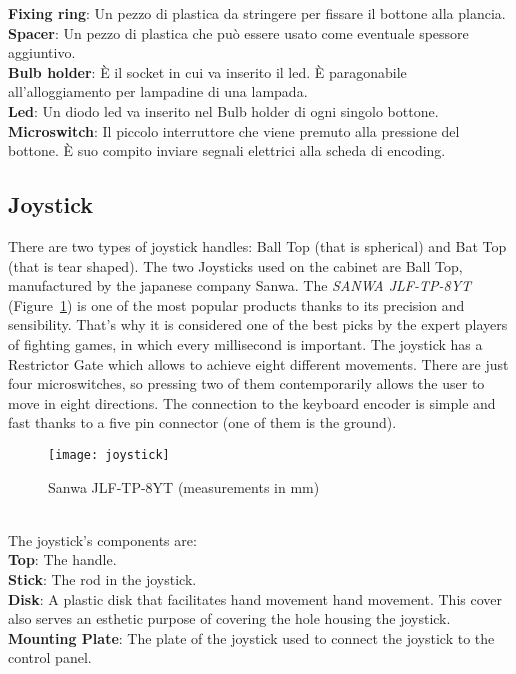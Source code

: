 \textbf{Fixing ring}: Un pezzo di plastica da stringere per fissare il bottone alla plancia.\\
\textbf{Spacer}: Un pezzo di plastica che può essere usato come eventuale spessore aggiuntivo.\\
\textbf{Bulb holder}: È il socket in cui va inserito il led. È paragonabile all’alloggiamento per lampadine di una lampada.\\
\textbf{Led}: Un diodo led va inserito nel Bulb holder di ogni singolo bottone.\\
\textbf{Microswitch}: Il piccolo interruttore che viene premuto alla pressione del bottone. È suo compito inviare segnali elettrici alla scheda di encoding.\\
\subsection{Joystick}
There are two types of joystick handles: Ball Top (that is spherical) and Bat Top (that is tear shaped). The two Joysticks used on the cabinet are Ball Top, manufactured by the japanese company Sanwa. The \textit{SANWA JLF-TP-8YT} (Figure~\ref{fig:joystick}) is one of the most popular products thanks to its precision and sensibility. That’s why it is considered one of the best picks by the expert players of fighting games, in which every millisecond is important. The joystick has a Restrictor Gate which allows to achieve eight different movements. There are just four microswitches, so pressing two of them contemporarily allows the user to move in eight directions. The connection to the keyboard encoder is simple and fast thanks to a five pin connector (one of them is the ground).\\
\begin{figure}[!h]
\texttt{[image: joystick]}
\centering
\caption{Sanwa JLF-TP-8YT (measurements in mm)}
\label{fig:joystick}
\end{figure}
\\The joystick’s components are:\\
\textbf{Top}: The handle.\\
\textbf{Stick}: The rod in the joystick.\\
\textbf{Disk}: A plastic disk that facilitates hand movement hand movement. This cover also serves an esthetic purpose of covering the hole housing the joystick.\\
\textbf{Mounting Plate}: The plate of the joystick used to connect the joystick to the control panel.\\
